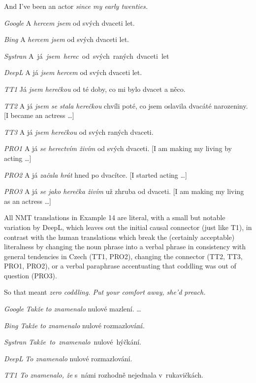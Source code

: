 \documentclass[output=paper]{langscibook}
\begin{document}
\ea \label{ex:kamenicka:9}

And I've been an actor \textit{since my early twenties.}

\textit{Google} A \textit{hercem jsem} od svých dvaceti let.

\textit{Bing} A \textit{hercem jsem} od svých dvaceti let.

\textit{Systran} A~já~\textit{jsem~herec}~od~svých~raných~dvaceti~let

\textit{DeepL} A já \textit{jsem hercem} od svých dvaceti let.

\textit{TT1} Já \textit{jsem herečkou} od té doby, co mi bylo dvacet a něco.

\textit{TT2} A já \textit{jsem se stala herečkou} chvíli poté, co jsem oslavila dvacáté narozeniny. [I became an actress …]

\textit{TT3} A já \textit{jsem herečkou} od svých raných dvaceti.

\textit{PRO1} A já \textit{se herectvím živím} od svých dvaceti. [I am making my living by acting …]

\textit{PRO2} A já \textit{začala hrát} hned po dvacítce. [I started acting …]

\textit{PRO3} A já \textit{se jako herečka živím} už zhruba od dvaceti. [I am making my living as an actress …]

\z
All NMT translations in Example 14 are literal, with a small but notable variation by DeepL, which leaves out the initial causal connector (just like T1), in contrast with the human translations which break the (certainly acceptable) literalness by changing the noun phrase into a verbal phrase in consistency with general tendencies in Czech (TT1, PRO2), changing the connector (TT2, TT3, PRO1, PRO2), or a verbal paraphrase accentuating that coddling was out of question (PRO3).

\ea \label{ex:kamenicka:10}

So that meant \textit{zero coddling. Put your comfort away, she'd preach.}

\textit{Google} \textit{Takže to znamenalo} nulové mazlení. …

\textit{Bing Takže to znamenalo} nulové rozmazlování.

\textit{Systran Takže~to~znamenalo}~nulové~hýčkání.~

\textit{DeepL} \textit{To znamenalo} nulové rozmazlování.

\textit{TT1 To znamenalo, že} s~námi rozhodně nejednala v~rukavičkách.
\end{document}
